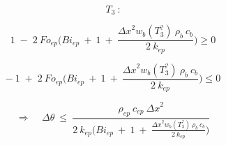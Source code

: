 \begin{adjustwidth}{0cm}{0cm}
	\begin{multicols}{3} %
		
		
		\hspace{-3cm}
		\begin{minipage}{\columnwidth}	
			\vspace{1cm}
			$$T_3 \: \mbox{:}$$ 
		\end{minipage}
		
		\columnbreak %
		
		
		\hspace{-5.5cm}
		\begin{minipage}{\columnwidth}	
			$$
			1 \;-\;  2 \: Fo_{ep} \Big(Bi_{ep} \:+\: 1 \:+\:  \frac{{\Delta x}^2 w_b (T_3^?) \: \rho _b \: c_b}{2 \: k_{ep}} \Big) \geq 0
			$$
			
			\vspace{-1cm}
			
			$$
			- \: 1 \;+\; 2 \: Fo_{ep} \Big(Bi_{ep} \:+\: 1 \:+\:  \frac{{\Delta x}^2 w_b (T_3^?) \: \rho _b \: c_b}{2 \: k_{ep}} \Big) \leq 0
			$$
			
			
		\end{minipage}
		
		\columnbreak
		
		\hspace{-1.5cm}
		\begin{minipage}{1.3\columnwidth}
			\vspace{0.7cm}
			$$
			\Rightarrow \;\;\;\; \Delta \theta \:\leq\: \frac{\rho_{ep} \: c_{ep} \: {\Delta x}^2}{2\: k_{ep}\Big(Bi_{ep} \:+\: 1 \:+\:  \frac{{\Delta x}^2 w_b (T_3^?) \: \rho _b \: c_b}{2 \: k_{ep}} \Big)}
			$$
		\end{minipage}
		
	\end{multicols}
\end{adjustwidth}




\newpage


